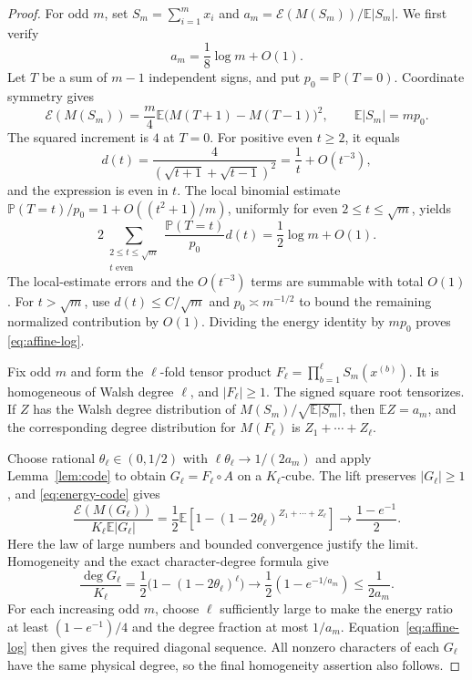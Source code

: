 \documentclass[10pt]{article}
\newcommand{\E}{\mathbb E}
\newcommand{\Prb}{\mathbb P}
\newcommand{\En}{\mathcal E}
\begin{document}
\begin{proof}
For odd $m$, set $S_m=\sum_{i=1}^m x_i$ and
$a_m=\En(M(S_m))/\E|S_m|$. We first verify
\begin{equation}\label{eq:affine-log}
 a_m=\frac18\log m+O(1).
\end{equation}
Let $T$ be a sum of $m-1$ independent signs, and put $p_0=\Prb(T=0)$.
Coordinate symmetry gives
\[
 \En(M(S_m))=\frac m4\E\bigl(M(T+1)-M(T-1)\bigr)^2,
       \qquad \E|S_m|=mp_0.
\]
The squared increment is $4$ at $T=0$. For positive even $t\ge2$,
it equals
\[
 d(t)=\frac4{(\sqrt{t+1}+\sqrt{t-1})^2}
       =\frac1t+O(t^{-3}),
\]
and the expression is even in $t$. The local binomial estimate
$\Prb(T=t)/p_0=1+O((t^2+1)/m)$, uniformly for even
$2\le t\le\sqrt m$, yields
\[
 2\sum_{\substack{2\le t\le\sqrt m\\t\text{ even}}}
       \frac{\Prb(T=t)}{p_0}d(t)
       =\frac12\log m+O(1).
\]
The local-estimate errors and the $O(t^{-3})$ terms are summable with
total $O(1)$. For $t>\sqrt m$, use $d(t)\le C/\sqrt m$ and
$p_0\asymp m^{-1/2}$ to bound the remaining normalized contribution
by $O(1)$. Dividing the energy identity by $mp_0$ proves
\eqref{eq:affine-log}.

Fix odd $m$ and form the $\ell$-fold tensor product
$F_\ell=\prod_{b=1}^\ell S_m(x^{(b)})$. It is homogeneous of
Walsh degree $\ell$, and $|F_\ell|\ge1$. The signed square root
tensorizes. If $Z$ has the Walsh degree distribution of
$M(S_m)/\sqrt{\E|S_m|}$, then $\E Z=a_m$, and the corresponding
degree distribution for $M(F_\ell)$ is $Z_1+\cdots+Z_\ell$.

Choose rational $\theta_\ell\in(0,1/2)$ with
$\ell\theta_\ell\to1/(2a_m)$ and apply Lemma~\ref{lem:code}
to obtain $G_\ell=F_\ell\circ A$ on a $K_\ell$-cube. The lift
preserves $|G_\ell|\ge1$, and \eqref{eq:energy-code} gives
\[
 \frac{\En(M(G_\ell))}{K_\ell\E|G_\ell|}
   =\frac12\E\left[1-(1-2\theta_\ell)^{Z_1+\cdots+Z_\ell}\right]
   \longrightarrow\frac{1-e^{-1}}2.
\]
Here the law of large numbers and bounded convergence justify the
limit. Homogeneity and the exact character-degree formula give
\[
 \frac{\deg G_\ell}{K_\ell}
 =\frac12\bigl(1-(1-2\theta_\ell)^\ell\bigr)
 \longrightarrow\frac12(1-e^{-1/a_m})\le\frac1{2a_m}.
\]
For each increasing odd $m$, choose $\ell$ sufficiently large to make
the energy ratio at least $(1-e^{-1})/4$ and the degree fraction at
most $1/a_m$. Equation~\eqref{eq:affine-log} then gives the required
diagonal sequence. All nonzero characters of each $G_\ell$ have the
same physical degree, so the final homogeneity assertion also follows.
\end{proof}
\end{document}
